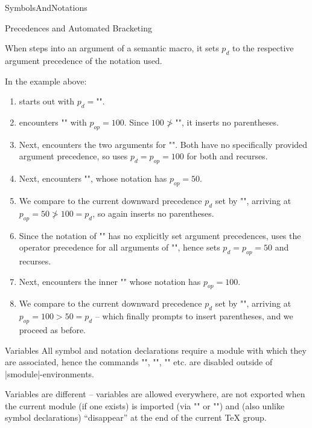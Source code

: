 \begin{smodule}[ns=https://github.com/slatex/sTeX/doc]{SymbolsAndNotations}
\begin{sfragment}{Precedences and Automated Bracketing}
\begin{dangerbox}
  When \sTeX steps into an argument of a semantic macro, it sets $p_d$ to the respective
  argument precedence of the notation used.

  In the example above:
  \begin{enumerate}
  \item \sTeX starts out with $p_d=$\stexcode"\infprec".
  \item \sTeX encounters \stexcode"\addition" with $p_{op}=100$. Since
    $100\not>$\stexcode"\infprec", it inserts no parentheses.
  \item Next, \sTeX encounters the two arguments for \stexcode"\addition".  Both have no
    specifically provided argument precedence, so \sTeX uses $p_d=p_{op}=100$ for both and
    recurses.
  \item Next, \sTeX encounters \stexcode"", whose notation has
    $p_{op}=50$.
  \item We compare to the current downward precedence $p_d$ set by \stexcode"\addition",
    arriving at $p_{op}=50\not>100=p_d$, so \sTeX again inserts no parentheses.
  \item Since the notation of \stexcode"\multiplication" has no explicitly set argument
    precedences, \sTeX uses the operator precedence for all arguments of
    \stexcode"\multiplication", hence sets $p_d=p_{op}=50$ and recurses.
  \item Next, \sTeX encounters the inner \stexcode"" whose notation has
    $p_{op}=100$.
  \item We compare to the current downward precedence $p_d$ set by
    \stexcode"\multiplication", arriving at $p_{op}=100>50=p_d$ -- which finally prompts
    \sTeX to insert parentheses, and we proceed as before.
  \end{enumerate}
\end{dangerbox}
\end{sfragment}

\begin{sfragment}{Variables}
  All symbol and notation declarations require a module with which they are associated,
  hence the commands \stexcode"\symdecl", \stexcode"\notation", \stexcode"\symdef"
  etc. are disabled outside of |smodule|-environments.

  Variables are different -- variables are allowed everywhere, are not exported when the
  current module (if one exists) is imported (via \stexcode"\importmodule" or
  \stexcode"\usemodule") and (also unlike symbol declarations) ``disappear'' at the end of
  the current \TeX\xspace group.


\end{sfragment}
\end{smodule}
